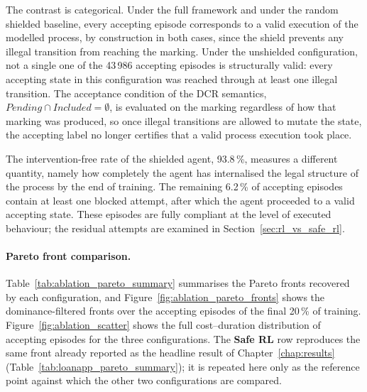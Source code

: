 The contrast is categorical. Under the full framework and under the
random shielded baseline, every accepting episode corresponds to a
valid execution of the modelled process, by construction in both
cases, since the shield prevents any illegal transition from reaching
the marking. Under the unshielded configuration, not a single one of
the 43\,986 accepting episodes is structurally valid: every accepting
state in this configuration was reached through at least one illegal
transition. The acceptance condition of the \ac{DCR} semantics,
$\mathit{Pending} \cap \mathit{Included} = \emptyset$, is evaluated on
the marking regardless of how that marking was produced, so once
illegal transitions are allowed to mutate the state, the accepting
label no longer certifies that a valid process execution took place.

The intervention-free rate of the shielded agent, 93.8\,\%, measures a
different quantity, namely how completely the agent has internalised
the legal structure of the process by the end of training. The
remaining 6.2\,\% of accepting episodes contain at least one blocked
attempt, after which the agent proceeded to a valid accepting state.
These episodes are fully compliant at the level of executed behaviour;
the residual attempts are examined in
Section~\ref{sec:rl_vs_safe_rl}.

\paragraph{Pareto front comparison.}
Table~\ref{tab:ablation_pareto_summary} summarises the Pareto fronts
recovered by each configuration, and
Figure~\ref{fig:ablation_pareto_fronts} shows the dominance-filtered
fronts over the accepting episodes of the final 20\,\% of training.
Figure~\ref{fig:ablation_scatter} shows the full cost--duration
distribution of accepting episodes for the three configurations. The
\textbf{Safe \ac{RL}} row reproduces the same front already reported as
the headline result of Chapter~\ref{chap:results}
(Table~\ref{tab:loanapp_pareto_summary}); it is repeated here only as
the reference point against which the other two configurations are
compared.

